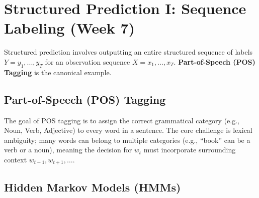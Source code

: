 \documentclass{article}
\begin{document}
\begin{table}[h!]
\centering
\caption{Decoding Strategy Comparison}
\end{table}

\section{Structured Prediction I: Sequence Labeling (Week 7)}

Structured prediction involves outputting an entire structured sequence of labels $Y = y_1,..., y_T$ for an observation sequence $X = x_1,..., x_T$. \textbf{Part-of-Speech (POS) Tagging} is the canonical example.

\subsection{Part-of-Speech (POS) Tagging}

The goal of POS tagging is to assign the correct grammatical category (e.g., Noun, Verb, Adjective) to every word in a sentence. The core challenge is lexical ambiguity; many words can belong to multiple categories (e.g., ``book'' can be a verb or a noun), meaning the decision for $w_t$ must incorporate surrounding context $w_{t-1}, w_{t+1}, \dots$.

\subsection{Hidden Markov Models (HMMs)}
\end{document}
